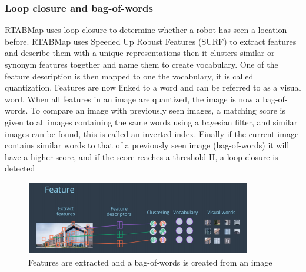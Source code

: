 \documentclass[10pt,journal,compsoc]{IEEEtran}
\begin{document}
\subsubsection{Loop closure and bag-of-words}
RTABMap uses loop closure to determine whether a robot
has seen a location before. RTABMap uses Speeded Up
Robust Features (SURF) to extract features and describe
them with a unique representations then it clusters similar
or synonym features together and name them to create
vocabulary. One of the feature description is then mapped
to one the vocabulary, it is called quantization. Features are
now linked to a word and can be referred to as a visual
word. When all features in an image are quantized, the
image is now a bag-of-words. To compare an image with
previously seen images, a matching score is given to all
images containing the same words using a bayesian filter,
and similar images can be found, this is called an inverted
index. Finally if the current image contains similar words to
that of a previously seen image (bag-of-words) it will have
a higher score, and if the score reaches a threshold H, a loop
closure is detected
\begin{figure}[thpb]
      \centering
      \includegraphics[width=\linewidth]{bag_of_words}
      \caption{ Features are extracted and a bag-of-words is created from an image}
      \label{fig:bow}
\end{figure}
\end{document}
